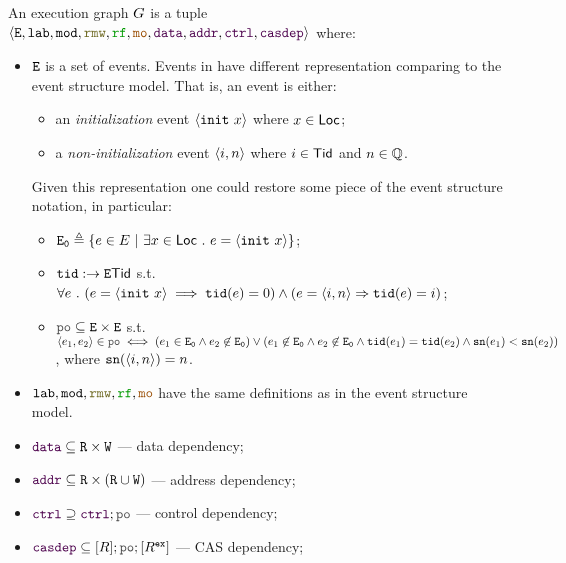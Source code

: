 \documentclass[12pt]{article}
\begin{document}
\begin{definition}
  An \imm execution graph $G$ is a tuple \\
  $\tup{\lE, \lLAB, \lMOD, \lRMW, \lRF, \lMO, \lDATA, \lADDR, \lCTRL, \lCASDEP}$ where:
  \begin{itemize}
    \item ${\mathtt{E}}$ is a set of events. 
      Events in \imm have different representation comparing to the event structure model. 
      That is, an event is either:
      \begin{itemize}
        \item an \emph{initialization} event $\langle {\mathtt{init}}~x \rangle$ where $x \in \mathsf{Loc}$;
        \item a \emph{non-initialization} event $\langle i, n \rangle$ where $i \in \mathsf{Tid}$ and $n \in {\mathbb{Q}}$.
      \end{itemize}
      Given this representation one could restore some piece of the event structure notation, 
      in particular:
      \begin{itemize}
        \item ${\mathtt{E_0}} \triangleq \{e \in E ~|~ \exists{x} \in \mathsf{Loc} ~.~ e = \langle {\mathtt{init}}~x \rangle\}$;
        \item ${\mathtt{tid}} : \rightarrow{{\mathtt{E}}}{\mathsf{Tid}}$ s.t. \\
          $\forall{e} ~.~ (e = \langle {\mathtt{init}}~x \rangle \implies {\mathtt{tid}}(e) = 0) \wedge 
           (e = \langle i, n \rangle \Rightarrow {\mathtt{tid}}(e) = i)$;
        \item $\lPO \subseteq \lE \times \lE$ s.t. \\
          $\tup{e_1, e_2} \in \lPO \iff (e_1 \in \lEi \wedge e_2 \not\in \lEi) \vee 
           (e_1 \not\in \lEi \wedge e_2 \not\in \lEi \wedge \lTID(e_1) = \lTID(e_2) \wedge
            \lSN(e_1) < \lSN(e_2))$, 
          where ${\mathtt{sn}}(\langle i, n \rangle) = n$.
      \end{itemize}
      \item $\lLAB, \lMOD, \lRMW, \lRF, \lMO$ have the same definitions
        as in the event structure model.
      \item $\lDATA \subseteq \lR \times \lW$ --- data dependency;
      \item $\lADDR \subseteq \lR \times (\lR \cup \lW)$ --- address dependency;
      \item $\lCTRL \supseteq \lCTRL; \lPO$ --- control dependency;
      \item $\lCASDEP \subseteq [R];\lPO;[R^{\Ex}]$ --- CAS dependency;
  \end{itemize}
\end{definition}
\end{document}
